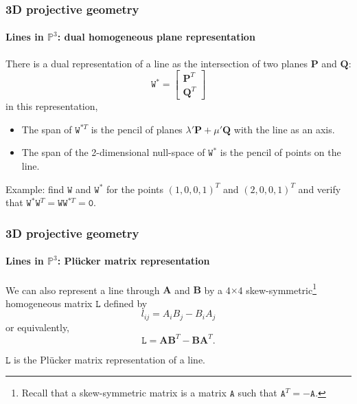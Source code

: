 \documentclass[aspectratio=169]{beamer}
\renewcommand{\vec}[1]{\boldsymbol{#1}}
\newcommand{\mat}[1]{\mathtt{#1}}
\def\Pset{\mathbb{P}}
\begin{document}
\begin{frame}
\frametitle{3D projective geometry}
\framesubtitle{Lines in $\Pset^3$: dual homogeneous plane representation}

There is a dual representation of a line as the \alert{intersection of two
planes} $\vec{P}$ and $\vec{Q}$:
\begin{equation*}
\mat{W}^* = \begin{bmatrix} \vec{P}^T \\ \vec{Q}^T \end{bmatrix}
\end{equation*}
in this representation,
\begin{itemize}
\item The \alert{span} of $\mat{W}^{*T}$ is the \alert{pencil of
  planes} $\lambda'\vec{P} + \mu'\vec{Q}$ with the line as an axis.
\item The span of the 2-dimensional \alert{null-space} of $\mat{W}^*$
  is the \alert{pencil of points} on the line.
\end{itemize}

\medskip

Example: find $\mat{W}$ and $\mat{W}^*$ for the points
$(1,0,0,1)^T$ and $(2,0,0,1)^T$
and verify that $\mat{W}^*\mat{W}^T=\mat{W}\mat{W}^{*T}=\mat{0}$.

\end{frame}

\begin{frame}
\frametitle{3D projective geometry}
\framesubtitle{Lines in $\Pset^3$: Pl\"ucker matrix representation}

We can also represent a line through $\vec{A}$ and $\vec{B}$ by a
4$\times$4 \alert{skew-symmetric}\footnote{Recall that a skew-symmetric matrix
is a matrix $\mat{A}$ such that $\mat{A}^T=-\mat{A}$.} homogeneous
matrix $\mat{L}$ defined by \[ l_{ij} = A_iB_j - B_iA_j \] or
equivalently,
\begin{equation*}
\mat{L} = \vec{A}\vec{B}^T - \vec{B}\vec{A}^T.
\end{equation*}

\medskip

$\mat{L}$ is the \alert{Pl\"ucker} matrix representation of a line.

\end{frame}
\end{document}

